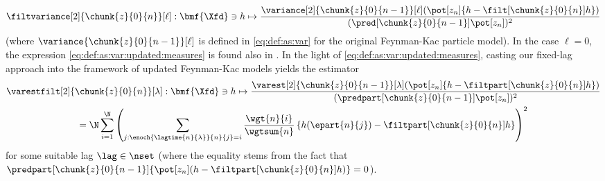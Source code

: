 \begin{equation} \label{eq:def:as:var:updated:measures}
    \filtvariance[2]{\chunk{z}{0}{n}}[\ell] : \bmf{\Xfd} \ni h \mapsto \frac{\variance[2]{\chunk{z}{0}{n - 1}}[\ell](\pot[z_n] \{ h - \filt[\chunk{z}{0}{n}] h \})}{(\pred[\chunk{z}{0}{n - 1}] \pot[z_n])^2}
\end{equation}
(where $\variance{\chunk{z}{0}{n - 1}}[\ell]$ is defined in \eqref{eq:def:as:var} for the original Feynman-Kac particle model). In the case $\ell = 0$, the expression \eqref{eq:def:as:var:updated:measures} is found also in \cite[Eqn.~(17)]{douc:moulines:olsson:2014}. In the light of \eqref{eq:def:as:var:updated:measures}, casting our fixed-lag approach into the framework of updated Feynman-Kac models yields the estimator 
\begin{multline} \label{eq:def:var:est:updated:measures}
    \varestfilt[2]{\chunk{z}{0}{n}}[\lambda] : \bmf{\Xfd} \ni h \mapsto \frac{\varest[2]{\chunk{z}{0}{n - 1}}[\lambda](\pot[z_n] \{h - \filtpart[\chunk{z}{0}{n}] h\})}{(\predpart[\chunk{z}{0}{n - 1}] \pot[z_n])^2} \\ 
    = \N \sum_{i = 1}^\N \left( \sum_{j : \enoch{\lagtime{n}{\lambda}}{n}{j} = i} \frac{\wgt{n}{i}}{\wgtsum{n}} \left\{ h(\epart{n}{j}) - \filtpart[\chunk{z}{0}{n}] h \right\} \right)^2
\end{multline}
for some suitable lag $\lag \in \nset$ (where the equality stems from the fact that $\predpart[\chunk{z}{0}{n - 1}] \{\pot[z_n](h -  \filtpart[\chunk{z}{0}{n}] h) \} = 0$).  





